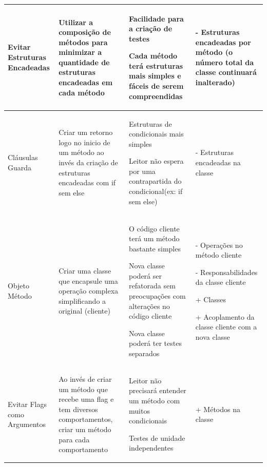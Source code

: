 \begin{landscape}
\begin{table}[hbt]
\begin{tabular}{|p{3.5cm}|p{5cm}|p{8.5cm}|p{7.2cm}|}
\hline 
Evitar Estruturas Encadeadas
& Utilizar a composição de métodos para minimizar a quantidade de estruturas encadeadas em cada método
& \begin{my_itemize}
	\item Facilidade para a criação de testes
	\item Cada método terá estruturas mais simples e fáceis de serem compreendidas
  \end{my_itemize}
& \begin{my_itemize}
	\item[-] Estruturas encadeadas por método (o número total da classe continuará inalterado)
  \end{my_itemize}
\tabularnewline

\hline 
Cláusulas Guarda
& Criar um retorno logo no inicio de um método ao invés da criação de estruturas encadeadas com if sem else
& \begin{my_itemize}
	\item Estruturas de condicionais mais simples
	\item Leitor não espera por uma contrapartida do condicional(ex: if sem else)
  \end{my_itemize}
& \begin{my_itemize}
	\item[-] Estruturas encadeadas na classe
  \end{my_itemize}
\tabularnewline

\hline
Objeto Método
& Criar uma classe que encapsule uma operação complexa simplificando a original (cliente)
& \begin{my_itemize}
	\item O código cliente terá um método bastante simples
	\item Nova classe poderá ser refatorada sem preocupações com alterações no código cliente
	\item Nova classe poderá ter testes separados
  \end{my_itemize}
& \begin{my_itemize}
	\item[-] Operações no método cliente
	\item[-] Responsabilidades da classe cliente
	\item[+] Classes
	\item[+] Acoplamento da classe cliente com a nova classe
  \end{my_itemize}
\tabularnewline

\hline
Evitar Flags como Argumentos
& Ao invés de criar um método que recebe uma flag e tem diversos comportamentos, criar  um  método para cada comportamento
& \begin{my_itemize}
	\item Leitor não precisará entender um método com muitos condicionais
	\item Testes de unidade independentes
  \end{my_itemize}
& \begin{my_itemize}
	\item[+] Métodos na classe
  \end{my_itemize}
\tabularnewline


\end{tabular}
\end{table}
\end{landscape}
